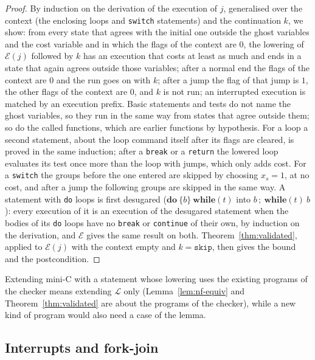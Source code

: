 \documentclass[oneside,english]{amsart}
\numberwithin{equation}{section}
\numberwithin{figure}{section}
\theoremstyle{plain}
\theoremstyle{definition}
\theoremstyle{plain}
\theoremstyle{remark}
\theoremstyle{plain}
\theoremstyle{definition}
\theoremstyle{plain}
\theoremstyle{remark}
\begin{document}
\begin{proof}
By induction on the derivation of the execution of $j$, generalised over the context (the enclosing loops and \texttt{switch} statements) and the continuation $k$, we show: from every state that agrees with the initial one outside the ghost variables and the cost variable and in which the flags of the context are $0$, the lowering of $\mathcal{E}(j)$ followed by $k$ has an execution that costs at least as much and ends in a state that again agrees outside those variables; after a normal end the flags of the context are $0$ and the run goes on with $k$; after a jump the flag of that jump is $1$, the other flags of the context are $0$, and $k$ is not run; an interrupted execution is matched by an execution prefix. Basic statements and tests do not name the ghost variables, so they run in the same way from states that agree outside them; so do the called functions, which are earlier functions by hypothesis. For a loop a second statement, about the loop command itself after its flags are cleared, is proved in the same induction; after a \texttt{break} or a \texttt{return} the lowered loop evaluates its test once more than the loop with jumps, which only adds cost. For a \texttt{switch} the groups before the one entered are skipped by choosing $x_s = 1$, at no cost, and after a jump the following groups are skipped in the same way. A statement with \texttt{do} loops is first desugared ($\mathbf{do}\ \{b\}\ \mathbf{while}(t)$ into $b\,;\ \mathbf{while}(t)\ b$): every execution of it is an execution of the desugared statement when the bodies of its \texttt{do} loops have no \texttt{break} or \texttt{continue} of their own, by induction on the derivation, and $\mathcal{E}$ gives the same result on both. Theorem~\ref{thm:validated}, applied to $\mathcal{E}(j)$ with the context empty and $k = \mathtt{skip}$, then gives the bound and the postcondition.
\end{proof}

Extending mini-C with a statement whose lowering uses the existing programs of the checker means extending $\mathcal{L}$ only (Lemma~\ref{lem:nf-equiv} and Theorem~\ref{thm:validated} are about the programs of the checker), while a new kind of program would also need a case of the lemma.

\subsection{Interrupts and fork-join}
\label{subsec:concurrency}
\end{document}
